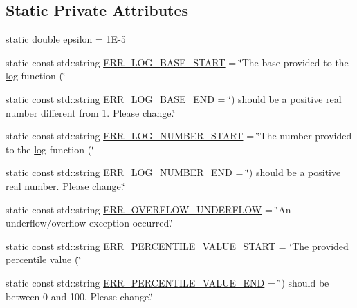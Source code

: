 \subsection*{\-Static \-Private \-Attributes}
\begin{DoxyCompactItemize}
\item 
static double \hyperlink{classmultiscale_1_1Numeric_ac66cc2092ff149af068ac93aa3a6cc51}{epsilon} = 1\-E-\/5
\item 
static const std\-::string \hyperlink{classmultiscale_1_1Numeric_a551052e6be615efea82ea046ba178010}{\-E\-R\-R\-\_\-\-L\-O\-G\-\_\-\-B\-A\-S\-E\-\_\-\-S\-T\-A\-R\-T} = \char`\"{}\-The base provided to the \hyperlink{classmultiscale_1_1Numeric_a27b50deac29d8aca5c41c8b19fba43e9}{log} function (\char`\"{}
\item 
static const std\-::string \hyperlink{classmultiscale_1_1Numeric_a291c98ea0c6e6c4042fe9ecc4af0443a}{\-E\-R\-R\-\_\-\-L\-O\-G\-\_\-\-B\-A\-S\-E\-\_\-\-E\-N\-D} = \char`\"{}) should be a positive real number different from 1. \-Please change.\char`\"{}
\item 
static const std\-::string \hyperlink{classmultiscale_1_1Numeric_a88ca9309ade745700dacbdc7c0d713f2}{\-E\-R\-R\-\_\-\-L\-O\-G\-\_\-\-N\-U\-M\-B\-E\-R\-\_\-\-S\-T\-A\-R\-T} = \char`\"{}\-The number provided to the \hyperlink{classmultiscale_1_1Numeric_a27b50deac29d8aca5c41c8b19fba43e9}{log} function (\char`\"{}
\item 
static const std\-::string \hyperlink{classmultiscale_1_1Numeric_a2f61b82d42049e175a8d34cd75966c6c}{\-E\-R\-R\-\_\-\-L\-O\-G\-\_\-\-N\-U\-M\-B\-E\-R\-\_\-\-E\-N\-D} = \char`\"{}) should be a positive real number. \-Please change.\char`\"{}
\item 
static const std\-::string \hyperlink{classmultiscale_1_1Numeric_aa56bde8322d97ccc99c252b951d44a9d}{\-E\-R\-R\-\_\-\-O\-V\-E\-R\-F\-L\-O\-W\-\_\-\-U\-N\-D\-E\-R\-F\-L\-O\-W} = \char`\"{}\-An underflow/overflow exception occurred.\char`\"{}
\item 
static const std\-::string \hyperlink{classmultiscale_1_1Numeric_a3bdb010188c74dc7570f950539df5e93}{\-E\-R\-R\-\_\-\-P\-E\-R\-C\-E\-N\-T\-I\-L\-E\-\_\-\-V\-A\-L\-U\-E\-\_\-\-S\-T\-A\-R\-T} = \char`\"{}\-The provided \hyperlink{classmultiscale_1_1Numeric_aff0c6b0c3d82bec3761a5e2d08394513}{percentile} value (\char`\"{}
\item 
static const std\-::string \hyperlink{classmultiscale_1_1Numeric_a0f89f3a8ecbc3709bac3f04b83819bf6}{\-E\-R\-R\-\_\-\-P\-E\-R\-C\-E\-N\-T\-I\-L\-E\-\_\-\-V\-A\-L\-U\-E\-\_\-\-E\-N\-D} = \char`\"{}) should be between 0 and 100. \-Please change.\char`\"{}

\end{DoxyCompactItemize}
